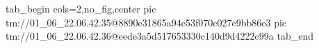  
 
 
 
 

\qqSecOrig


\ifcmt
  tab_begin cols=2,no_fig,center
    pic tm://01_06_22.06.42.35@8890e31865a94e53f070c027e9bb86e3
    pic tm://01_06_22.06.42.36@eede3a5d517653330c140d9d4222e99a
  tab_end
\fi

